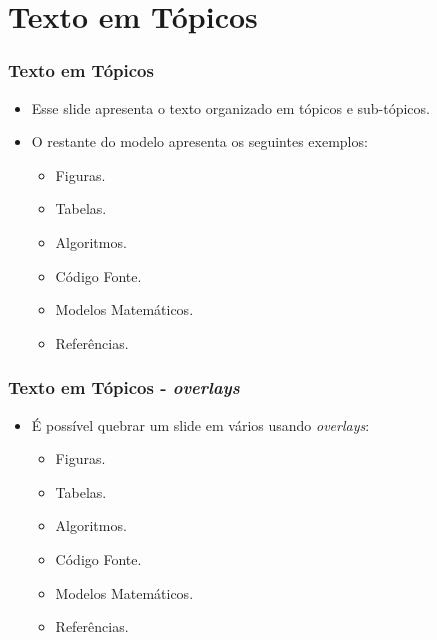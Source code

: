 \documentclass[mathsans,times]{beamer}
\begin{document}
\section{Texto em Tópicos}

\begin{frame}
	\frametitle{Texto em Tópicos}
	\begin{itemize}
	\item Esse slide apresenta o texto organizado em tópicos e sub-tópicos.
	\vspace{3mm}
	\item O restante do modelo apresenta os seguintes exemplos:
	\begin{itemize} 
		\item Figuras.
		\item Tabelas.
		\item Algoritmos.
		\item Código Fonte.
		\item Modelos Matemáticos.
		\item Referências.
	\end{itemize} 
\end{itemize}
\end{frame}

\begin{frame}
	\frametitle{Texto em Tópicos - \textit{overlays}}
\begin{itemize}
	\item É possível quebrar um slide em vários usando \textit{overlays}:
	\begin{itemize} 
		\item <1-> Figuras.
		\item <2-> Tabelas.
		\item <3-> Algoritmos.
		\item <4-> Código Fonte.
		\item <5-> Modelos Matemáticos.
		\item <6> Referências.
	\end{itemize} 
\end{itemize}
\end{frame}
\end{document}
